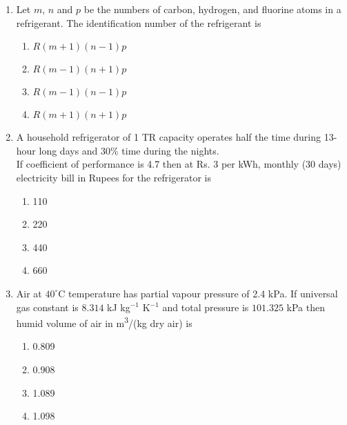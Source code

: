 \documentclass[journal]{IEEEtran}
\numberwithin{equation}{enumi}
\numberwithin{figure}{enumi}
\begin{document}
\begin{enumerate}
    \item Let $m$, $n$ and $p$ be the numbers of carbon, hydrogen, and fluorine atoms in a refrigerant. The identification number of the refrigerant is
     \hfill{}
\begin{multicols}{4}
    \begin{enumerate}
    \item $R(m+1)(n-1)p$
    \item  $R(m-1)(n+1)p$
    \item $R(m-1)(n-1)p$
    \item  $R(m+1)(n+1)p$
    \end{enumerate}
    \end{multicols}


     
    \item A household refrigerator of 1 TR capacity operates half the time during 13-hour long days and 30\% time during the nights.\\
    If coefficient of performance is 4.7 then at Rs. 3 per kWh, monthly (30 days) electricity bill in Rupees for the refrigerator is
      \hfill{}
\begin{multicols}{4}
    \begin{enumerate}
    \item 110
    \item 220
    \item 440
    \item 660
    \end{enumerate}
    \end{multicols}

    

    \item Air at $40^\circ$C temperature has partial vapour pressure of 2.4 kPa. If universal gas constant is $8.314$ kJ kg$^{-1}$ K$^{-1}$ and total pressure is $101.325$ kPa then humid volume of air in m\textsuperscript{3}/(kg dry air) is
      \hfill{}
\begin{multicols}{4}
    \begin{enumerate}
    \item 0.809
    \item 0.908
    \item 1.089
    \item 1.098
    \end{enumerate}
    \end{multicols}
      



\end{enumerate}
\end{document}

